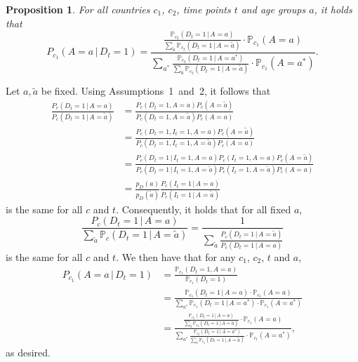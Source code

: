 \documentclass[a4paper]{article}
\newtheorem{prop}{Proposition}
\renewcommand\P{\mathbb{P}}
\newcommand{\given}{\, \vert \,}
\begin{document}
{\begin{prop}
For all countries $c_1$, $c_2$, time points $t$ and age groups $a$, it holds that
\begin{equation*}
P_{c_1}(A = a \given D_t = 1) =
\frac{
  \frac{
    \P_{c_2}(D_t = 1\given A = a)}
    {\sum_{\tilde{a}} \P_{c_2}(D_t = 1 \given A = \tilde{a})} \cdot \P_{c_1}(A = a)}
  {\sum_{a^*}  
  \frac{
    \P_{c_2}(D_t = 1\given A = a^*)}
    {\sum_{\tilde{a}} \P_{c_2}(D_t = 1 \given A = \tilde{a})} \cdot \P_{c_1}(A = a^*)}.
\end{equation*}
\end{prop}
%
\proof
Let $a, \tilde{a}$ be fixed. Using Assumptions~1~and~2, it follows that 
\begin{align*}
\frac{P_c(D_t = 1\,|\,A = a)}
{P_c(D_t = 1\,|\, A = \tilde{a})} 
&= 
\frac{
P_c(D_t = 1,A = a)
P_c(A = \tilde{a})}
{P_c(D_t = 1, A = \tilde{a})P_c(A = a)}  \\
&= 
\frac{
P_c(D_t = 1,I_t = 1, A = a)P_c(A = \tilde{a})}
{P_c(D_t = 1,I_t = 1, A = \tilde{a})P_c(A = a)} \\
&= 
\frac{
P_c(D_t = 1\,|\,I_t = 1, A = a)P_c(I_t = 1,A = a)P_c(A = \tilde{a})}
{P_c(D_t = 1\,|\,I_t = 1, A = \tilde{a})P_c(I_t = 1,A = \tilde{a})P_c(A = a)} \\
&= 
\frac{p_D(a)}{p_D(\tilde{a})}  \frac{P_c(I_t = 1\,|\,A = a)}{P_c(I_t = 1\,|\,A = \tilde{a})} 
\end{align*}
is the same for all $c$ and $t$. Consequently, it holds that for all fixed $a$,  
\begin{equation} \label{eq:d_invariant}
\frac{P_c(D_t = 1 \given A = a)}
{\sum_{\tilde{a}} \P_c(D_t = 1 \given A = \tilde{a})}
= 
\frac{1}{\sum_{\tilde{a}} \frac{P_c(D_t = 1\,|\,A = \tilde{a})}{P_c(D_t = 1\,|\,A = a)}}
\end{equation}
%
is the same for all $c$ and $t$. We then have that for any $c_1$, $c_2$, $t$ and $a$, 
\begin{align*}
P_{c_1}(A = a \given D_t = 1) &= 
\frac{  
    \P_{c_1}(D_t = 1, A = a)}
  {\P_{c_1}(D_t = 1)}\\
    &= 
\frac{  
    \P_{c_1}(D_t = 1\given A = a)
     \cdot \P_{c_1}(A = a)}
  {\sum_{a^*}  
    \P_{c_1}(D_t = 1\given A = a^*) \cdot \P_{c_1}(A = a^*)
    }\\
&= 
\frac{
  \frac{
    \P_{c_2}(D_t = 1\given A = a)}
    {\sum_{\tilde{a}} \P_{c_2}(D_t = 1 \given A = \tilde{a})} \cdot \P_{c_1}(A = a)}
  {\sum_{a^*}  
  \frac{
    \P_{c_2}(D_t = 1\given A = a^*)}
    {\sum_{\tilde{a}} \P_{c_2}(D_t = 1 \given A = \tilde{a})} \cdot \P_{c_1}(A = a^*)},
\end{align*}
as desired. 
\endproof

}
\end{document}
